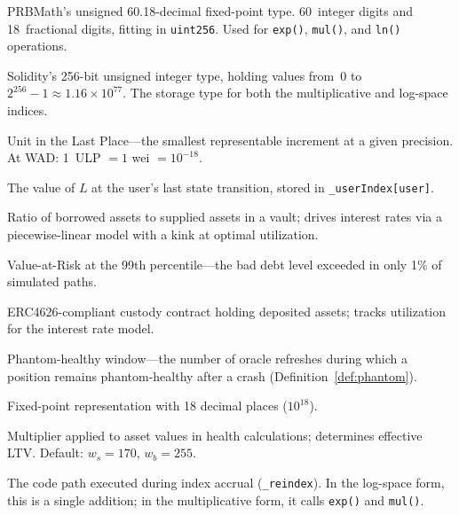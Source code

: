 \documentclass[10pt,a4paper,twocolumn]{article}
\begin{document}
\begin{description}[style=nextline, leftmargin=2.5em, labelindent=0em, font=\normalfont\bfseries]

\item[UD60x18] PRBMath's unsigned 60.18-decimal fixed-point type. 60~integer digits and 18~fractional digits, fitting in \texttt{uint256}. Used for \texttt{exp()}, \texttt{mul()}, and \texttt{ln()} operations.

\item[uint256] Solidity's 256-bit unsigned integer type, holding values from~0 to $2^{256} - 1 \approx 1.16 \times 10^{77}$. The storage type for both the multiplicative and log-space indices.

\item[ULP] Unit in the Last Place---the smallest representable increment at a given precision. At WAD: 1~ULP $= 1$ wei $= 10^{-18}$.

\item[User Snapshot ($L_u$)] The value of $L$ at the user's last state transition, stored in \texttt{\_userIndex[user]}.

\item[Utilization] Ratio of borrowed assets to supplied assets in a vault; drives interest rates via a piecewise-linear model with a kink at optimal utilization.


\item[$\text{VaR}(99\%)$\,$\dagger$] Value-at-Risk at the 99th percentile---the bad debt level exceeded in only 1\% of simulated paths.

\item[Vault] ERC4626-compliant custody contract holding deposited assets; tracks utilization for the interest rate model.


\item[$W$\,$\dagger$] Phantom-healthy window---the number of oracle refreshes during which a position remains phantom-healthy after a crash (Definition~\ref{def:phantom}).

\item[WAD] Fixed-point representation with 18 decimal places ($10^{18}$).

\item[Weight] Multiplier applied to asset values in health calculations; determines effective LTV. Default: $w_s = 170$, $w_b = 255$.

\item[Write Path] The code path executed during index accrual (\texttt{\_reindex}). In the log-space form, this is a single addition; in the multiplicative form, it calls \texttt{exp()} and \texttt{mul()}.

\end{description}

\ifbundle\else
\clearpage
\ifodd\value{page}\else\thispagestyle{empty}\null\clearpage\fi
\fi
\end{document}
